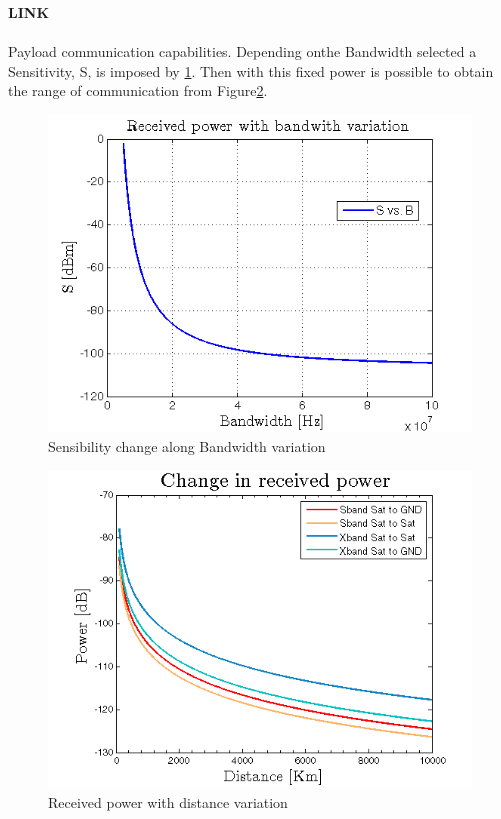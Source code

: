 \textbf{LINK} 
\paragraph{} Payload communication capabilities. Depending onthe Bandwidth selected a Sensitivity, S, is imposed by \ref{SvsB}. Then with this fixed power is possible to obtain the range of communication from Figure\ref{friis}.
\begin{figure}[h]
	\includegraphics[scale=0.9]{./sections/SatelliteConfiguration/SvsB}
	\centering
	\caption{Sensibility change along Bandwidth variation}
	\label{SvsB}
\end{figure}
\begin{figure}[h]
	\includegraphics[scale=0.9]{./sections/SatelliteConfiguration/friisCases}
	\centering
	\caption{Received power with distance variation}
	\label{friis}
\end{figure}






